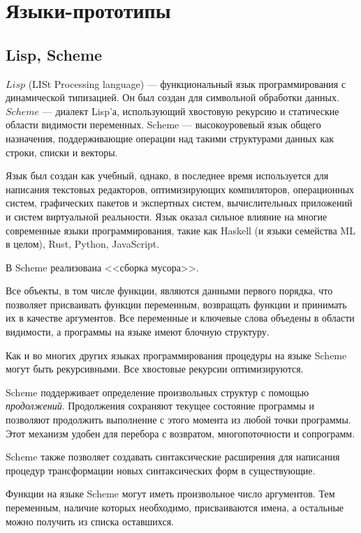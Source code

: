 \section{Языки-прототипы}
    \subsection{Lisp, Scheme}
        $Lisp$ (LISt Processing language) --- функциональный язык программирования с динамической типизацией. 
        Он был создан для символьной обработки данных\cite{p_c_lisp}.
        $Scheme$ --- диалект Lisp'а, использующий хвостовую рекурсию и статические области видимости переменных\cite{scheme_doc}.
        Scheme --- высокоуровевый язык общего назначения, поддерживающие операции над такими структурами данных как строки, списки и векторы.

        Язык был создан как учебный, однако, в последнее время используется для написания текстовых редакторов, оптимизирующих компиляторов, операционных систем, графических пакетов и экспертных систем, вычислительных приложений и систем виртуальной реальности.
        Язык оказал сильное влияние на многие современные языки программирования, такие как Haskell (и языки семейства ML в целом), Rust, Python, JavaScript.

        В Scheme реализована <<сборка мусора>>.
        
        Все объекты, в том числе функции, являются данными первого порядка, что позволяет присваивать функции переменным, возвращать функции и принимать их в качестве аргументов.
        Все переменные и ключевые слова объедены в области видимости, а программы на языке имеют блочную структуру.
        
        Как и во многих других языках программирования процедуры на языке Scheme могут быть рекурсивными.
        Все хвостовые рекурсии оптимизируются.

        Scheme поддерживает определение произвольных структур с помощью \textit{продолжений}.
        Продолжения сохраняют текущее состояние программы и позволяют продолжить выполнение с этого момента из любой точки программы.
        Этот механизм удобен для перебора с возвратом, многопоточности и сопрограмм.

        Scheme также позволяет создавать синтаксические расширения для написания процедур трансформации новых синтаксических форм в существующие\cite{scheme_pl}.

        Функции на языке Scheme могут иметь произвольное число аргументов.
        Тем переменным, наличие которых необходимо, присваиваются имена, а остальные можно получить из списка оставшихся.

